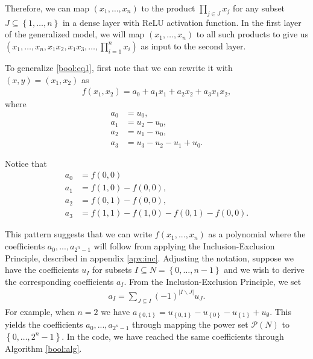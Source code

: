 \documentclass{somasmsc}
\begin{document}
Therefore, we can map $\left(x_1, \dots, x_n\right)$ to the product $\prod_{j \in J} x_j$ for any subset $J \subseteq \left\{1, \dots, n\right\}$ in a dense layer with ReLU activation function. In the first layer of the generalized model, we will map $\left(x_1, \dots, x_n\right)$ to all such products to give us $\left(x_1, \dots, x_n, x_1x_2, x_1x_3, \dots, \prod_{i=1}^n x_i\right)$ as input to the second layer.

To generalize \ref{bool:eq1}, first note that we can rewrite it with $\left(x, y\right) = \left(x_1, x_2\right)$ as
\begin{align*}
f(x_1, x_2) = a_0 + a_1 x_1 + a_2 x_2 + a_3 x_1 x_2,
\end{align*}
where
\begin{align*}
a_0 &= u_0, \\
a_1 &= u_2 - u_0, \\
a_2 &= u_1 - u_0, \\
a_3 &= u_3 - u_2 - u_1 + u_0.
\end{align*}

Notice that
\begin{align*}
a_0 &= f(0, 0) \\
a_1 &= f(1, 0) - f(0, 0), \\
a_2 &= f(0, 1) - f(0, 0), \\
a_3 &= f(1, 1) - f(1, 0) - f(0, 1) - f(0, 0).
\end{align*}

This pattern suggests that we can write $f(x_1, ..., x_n)$ as a polynomial where the coefficients $a_0, ..., a_{2^n-1}$ will follow from applying the Inclusion-Exclusion Principle, described in appendix \ref{apx:inc}. Adjusting the notation, suppose we have the coefficients $u_I$ for subsets $I \subseteq N = \left\{0, \dots, n-1\right\}$ and we wish to derive the corresponding coefficients $a_I$. From the Inclusion-Exclusion Principle, we set
\begin{align*}
    a_I = \sum_{J \subseteq I} \left(-1\right)^{|I \backslash J|} u_J.
\end{align*}
For example, when $n=2$ we have $a_{\left\{0,1\right\}} = u_{\left\{0,1\right\}} - u_{\left\{0\right\}} - u_{\left\{1\right\}} + u_{\emptyset}$. This yields the coefficients $a_0, ..., a_{2^n-1}$ through mapping the power set $\mathcal{P}\left(N\right)$ to $\left\{0, \dots, 2^n-1\right\}$. In the code, we have reached the same coefficients through Algorithm \ref{bool:alg}.
\end{document}

